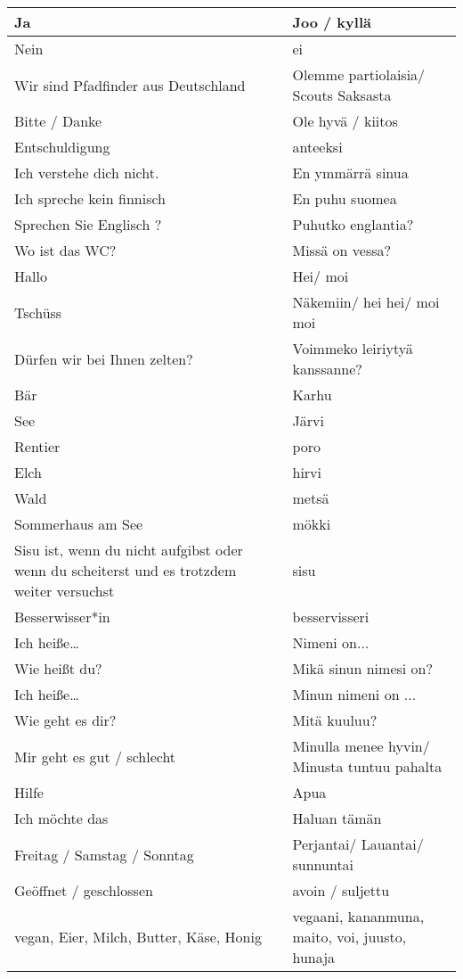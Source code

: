 \begin{table}[h!]
	\centering
	\small
	\begin{tabular}{m{6cm}m{6cm}}
	\hline
	Ja & Joo / kyllä \\ \hline
	Nein & ei \\ \hline
	Wir sind Pfadfinder aus Deutschland & Olemme partiolaisia/ Scouts Saksasta \\ \hline
	Bitte / Danke & Ole hyvä / kiitos \\ \hline
	Entschuldigung & anteeksi \\ \hline
	Ich verstehe dich nicht. & En ymmärrä sinua \\ \hline
	Ich spreche kein finnisch & En puhu suomea \\ \hline
	Sprechen Sie Englisch ? & Puhutko englantia? \\ \hline
	Wo ist das WC? & Missä on vessa? \\ \hline
	Hallo & Hei/ moi \\ \hline
	Tschüss & Näkemiin/ hei hei/ moi moi \\ \hline
	Dürfen wir bei Ihnen zelten? & Voimmeko leiriytyä kanssanne? \\ \hline
	Bär & Karhu \\ \hline
	See & Järvi \\ \hline
	Rentier & poro \\ \hline
	Elch & hirvi \\ \hline
	Wald & metsä \\ \hline
	Sommerhaus am See & mökki \\ \hline
	Sisu ist, wenn du nicht aufgibst oder wenn du scheiterst und es trotzdem weiter versuchst & sisu \\ \hline
	Besserwisser*in & besservisseri \\ \hline
	Ich heiße… & Nimeni on... \\ \hline
	Wie heißt du? & Mikä sinun nimesi on? \\ \hline
	Ich heiße… & Minun nimeni on ... \\ \hline
	Wie geht es dir? & Mitä kuuluu? \\ \hline
	Mir geht es gut / schlecht & Minulla menee hyvin/ Minusta tuntuu pahalta \\ \hline
	Hilfe & Apua \\ \hline
	Ich möchte das & Haluan tämän \\ \hline
	Freitag / Samstag / Sonntag & Perjantai/ Lauantai/ sunnuntai \\ \hline
	Geöffnet / geschlossen & avoin / suljettu \\ \hline
	\small vegan, Eier, Milch, Butter, Käse, Honig & \footnotesize vegaani, kananmuna, maito, voi, juusto, hunaja \\ \hline
\end{tabular}
\end{table}
	